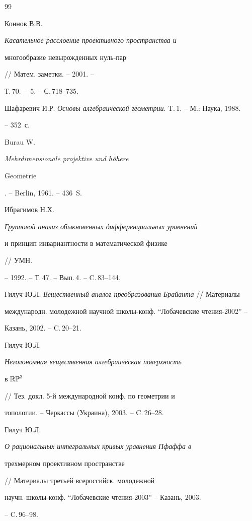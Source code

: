 \begin{thebibliography}{99}


Коннов В.В. {\it Касательное расслоение проективного пространства и 


многообразие невырожденных нуль-пар} // Матем. заметки. -- 2001. --


Т.\,70. -- \No\,5. -- С.\,718--735.




Шафаревич И.Р. {\it Основы алгебраической геометрии}. T.\,1. -- М.: Наука, 1988.


-- 352~с.




Burau W. {\it Mehrdimensionale projektive und h\"ohere 


Geometrie}. -- Berlin, 1961. -- 436~S.




Ибрагимов Н.Х. {\it Групповой анализ обыкновенных дифференциальных уравнений 


и принцип инвариантности в математической физике} // УМН.


-- 1992. -- Т.\,47. -- Вып.\,4. -- C.\,83--144.




Гилуч Ю.Л. {\it Вещественный аналог преобразования Брайанта} // Материалы 


международн. молодежной научной школы-конф. ``Лобачевские чтения-2002'' --


Казань, 2002. -- C.\,20--21.




Гилуч Ю.Л. {\it Неголономная вещественная алгебраическая поверхность 


в $\Bbb{RP}^3$} // Тез. докл. 5-й международной конф. по геометрии и 


топологии. -- Черкассы (Украина), 2003. -- C.\,26--28.




Гилуч Ю.Л. {\it О рациональных интегральных кривых уравнения Пфаффа в 


трехмерном проективном пространстве} // Материалы третьей всероссийск. молодежной 


научн. школы-конф. ``Лобачевские чтения-2003'' -- Казань, 2003.


-- C.\,96--98.





\end{thebibliography}





\vskip 2cm












\label{end}








